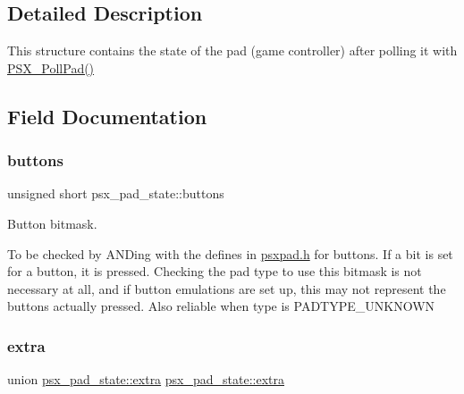 \subsection{Detailed Description}
This structure contains the state of the pad (game controller) after polling it with \hyperlink{psx_8h_a3375af2214d2bb2d8694e65c586d3fa4}{P\+S\+X\+\_\+\+Poll\+Pad()} 

\subsection{Field Documentation}
\mbox{\label{structpsx__pad__state_a26b197aa183a342446072509c0d1b800}} 
\subsubsection{\texorpdfstring{buttons}{buttons}}
{\footnotesize\ttfamily unsigned short psx\+\_\+pad\+\_\+state\+::buttons}



Button bitmask. 

To be checked by A\+ND\textquotesingle{}ing with the defines in \hyperlink{psxpad_8h}{psxpad.\+h} for buttons. If a bit is set for a button, it is pressed. Checking the pad type to use this bitmask is not necessary at all, and if button emulations are set up, this may not represent the buttons actually pressed. Also reliable when type is P\+A\+D\+T\+Y\+P\+E\+\_\+\+U\+N\+K\+N\+O\+WN \mbox{\label{structpsx__pad__state_a82998866e9a2516123c4b9974f598e9f}} 
\subsubsection{\texorpdfstring{extra}{extra}}
{\footnotesize\ttfamily union \hyperlink{unionpsx__pad__state_1_1extra}{psx\+\_\+pad\+\_\+state\+::extra} \hyperlink{unionpsx__pad__state_1_1extra}{psx\+\_\+pad\+\_\+state\+::extra}}

\mbox{\label{structpsx__pad__state_a2dadce1fa3022f813bd1cab8523bd61b}} 

